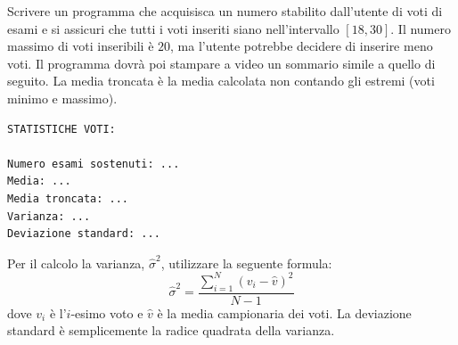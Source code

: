 \begin{Exercise}[label={ex:media_varianza}]
  	Scrivere un programma che acquisisca un numero stabilito dall'utente di voti di esami e si assicuri che tutti i voti inseriti siano nell'intervallo $[18,30]$. Il numero massimo di voti inseribili \`e $20$, ma l'utente potrebbe decidere di inserire meno voti. Il programma dovr\`a poi stampare a video un sommario simile a quello di seguito. La media troncata \`e la media calcolata non contando gli estremi (voti minimo e massimo).

\begin{lstlisting}[style=console]
STATISTICHE VOTI:

Numero esami sostenuti: ...
Media: ...
Media troncata: ...
Varianza: ...
Deviazione standard: ...
\end{lstlisting}

Per il calcolo la varianza, $\hat{\sigma}^2$, utilizzare la seguente formula:
\begin{equation}
  \hat{\sigma}^2 = \frac{\sum_{i = 1}^{N} (v_i - \hat{v})^2}{N-1}
\end{equation}
dove $v_i$ \`e l'$i$-esimo voto e $\hat{v}$ \`e la media campionaria dei voti. La deviazione standard \`e semplicemente la radice quadrata della varianza.
\end{Exercise}

\begin{Answer}[ref={ex:media_varianza}]
  
\end{Answer}
